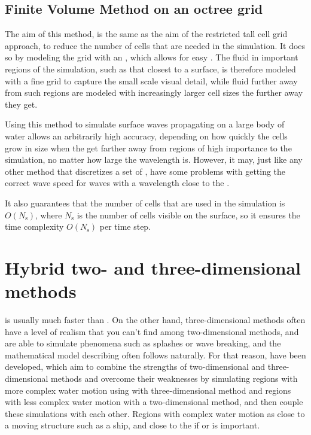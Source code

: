 \subsection{Finite Volume Method on an octree grid}

The aim of this method, is the same as the aim of the restricted tall cell grid approach, to reduce the number of cells that are needed in the simulation. It does so by modeling the grid with an \octree \citep[probably done first by][later also by \citealp{Losasso2004}]{Popinet2003}, which allows for easy . The fluid in important regions of the simulation, such as that closest to a surface, is therefore modeled with a fine grid to capture the small scale visual detail, while fluid further away from such regions are modeled with increasingly larger cell sizes the further away they get.

Using this method to simulate surface waves propagating on a large body of water allows an arbitrarily high accuracy, depending on how quickly the cells grow in size when the get farther away from regions of high importance to the simulation, no matter how large the wavelength is. However, it may, just like any other method that discretizes a set of \PDEs, have some problems with getting the correct wave speed for waves with a wavelength close to the .

It also guarantees that the number of cells that are used in the simulation is $O(N_{\text{s}})$, where $N_{\text{s}}$ is the number of cells visible on the surface, so it ensures the time complexity $O(N_{\text{s}})$ per time step.

\section{Hybrid two- and three-dimensional methods}

 is usually much faster than . On the other hand, three-dimensional methods often have a level of realism that you can't find among two-dimensional methods, and are able to simulate phenomena such as splashes or wave breaking, and the mathematical model describing \FSI often follows naturally. For that reason,  have been developed, which aim to combine the strengths of two-dimensional and three-dimensional methods and overcome their weaknesses by simulating regions with more complex water motion using with three-dimensional method and regions with less complex water motion with a two-dimensional method, and then couple these simulations with each other. Regions with complex water motion as close to a moving structure such as a ship, and close to the \shoreline if  or  is important.

